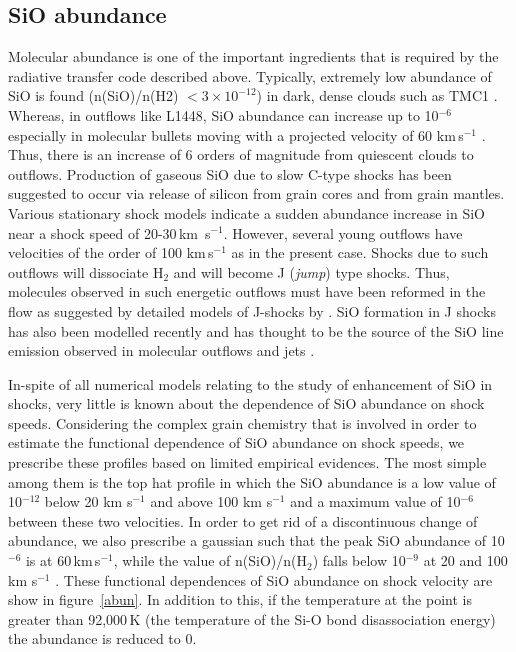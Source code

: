 \documentclass[useAMS,usenatbib]{mn2e}
\begin{document}
\subsection{SiO abundance}
\label{ssec:sioabun}
Molecular abundance is one of the important ingredients that is
required by the radiative transfer code described above. 
Typically, extremely low abundance of SiO is
found (n(SiO)/n(H2) $< 3\times10^{-12}$) in dark, dense clouds such
as TMC1 \citep{Ziurys:1989p14699,MartinPintado:1992p14309}. Whereas, in
outflows like L1448, SiO abundance can increase up to 10$^{-6}$ especially in
molecular bullets moving with a projected velocity of 60
km\,s$^{-1}$ \citep{Dutrey:1997p11185}. Thus, there is
an increase of 6 orders of magnitude from quiescent clouds
to outflows. Production of
gaseous SiO due to slow C-type shocks has been suggested to occur via release of
silicon from grain cores and from grain mantles. Various stationary
shock models indicate a sudden abundance increase in SiO 
near a shock speed of 20-30\,km\, s$^{-1}$. However, several young
outflows have velocities of the order of 100 km\,s$^{-1}$ as in the present
case. Shocks due to such outflows will dissociate H$_{2}$ and will
become J ({\em{jump}}) type shocks. Thus, molecules observed in such
energetic outflows must have been reformed in the flow as suggested by
detailed models of J-shocks by \cite{Neufeld:1989p14322}. SiO formation in J shocks
has also been modelled recently and has thought to be the source of
the SiO line emission observed in molecular outflows and jets
\citep{Guillet:2009p11229}.
%

In-spite of all numerical models relating to the study of enhancement
of SiO in shocks, very little is known about the dependence of SiO
abundance on shock speeds. Considering the complex grain
chemistry that is involved in order to estimate the functional
dependence of SiO abundance on shock speeds, we prescribe these
profiles based on limited empirical evidences. The most simple among
them is the top hat profile in which the SiO abundance is a low value of
10$^{-12}$ below 20 km s$^{-1}$ and above 100 km s$^{-1}$ and a
maximum value of 10$^{-6}$ between these two velocities.
In order to get rid of a discontinuous change of abundance, we also
prescribe a gaussian such that the peak SiO abundance of 10$^{-6}$ is at
60\,km\,s$^{-1}$, while the value of n(SiO)/n(H$_{2}$) falls below
10$^{-9}$ at 20 and 100 km s$^{-1}$
\citep[e.g.,][also see
section~\ref{sec:discussion}]{Lefloch:1998p13983}. 
These functional dependences of SiO
abundance on shock velocity are show in figure~\ref{abun}.  
In addition to this, if the temperature at the point is greater than
92,000\,K (the temperature of the Si-O bond disassociation energy) 
the abundance is reduced to 0. 
%
\end{document}
